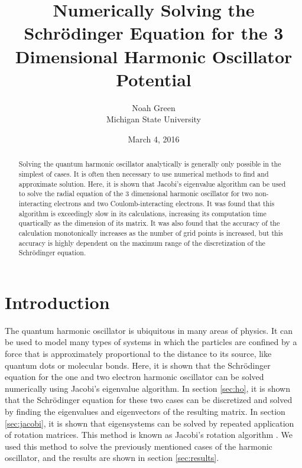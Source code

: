 \documentclass[a4paper,12pt]{report}
\begin{document}
\title{Numerically Solving the Schr\"odinger Equation for the 3 Dimensional Harmonic Oscillator Potential}
\author{Noah Green \\ Michigan State University}
\date{March 4, 2016}
\maketitle
\begin{abstract}
Solving the quantum harmonic oscillator analytically is generally only possible in the simplest of cases. It is often then necessary to use numerical methods to find and approximate solution. Here, it is shown that Jacobi's eigenvalue algorithm can be used to solve the radial equation of the 3 dimensional harmonic oscillator for two non-interacting electrons and two Coulomb-interacting electrons. It was found that this algorithm is exceedingly slow in its calculations, increasing its computation time quartically as the dimension of its matrix. It was also found that the accuracy of the calculation monotonically increases as the number of grid points is increased, but this accuracy is highly dependent on the maximum range of the discretization of the Schr\"odinger equation.
\end{abstract}

\doublespacing
\section{Introduction}\label{sec:intro}
The quantum harmonic oscillator is ubiquitous in many areas of physics. It can be used to model many types of systems in which the particles are confined by a force that is approximately proportional to the distance to its source, like quantum dots or molecular bonds. Here, it is shown that the Schr\"odinger equation for the one and two electron harmonic oscillator can be solved numerically using Jacobi's eigenvalue algorithm. In section \ref{sec:ho}, it is shown that the Schr\"odinger equation for these two cases can be discretized and solved by finding the eigenvalues and eigenvectors of the resulting matrix. In section \ref{sec:jacobi}, it is shown that eigensystems can be solved by repeated application of rotation matrices. This method is known as Jacobi's rotation algorithm \cite{dux:2016}. We used this method to solve the previously mentioned cases of the harmonic oscillator, and the results are shown in section \ref{sec:results}.
\end{document}
